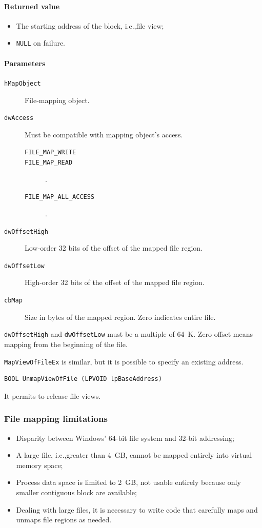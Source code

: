 \paragraph{Returned value}
\begin{itemize}
\item The starting address of the block, i.e.,\@ file view;
\item \texttt{NULL} on failure.
\end{itemize}

\paragraph{Parameters}
\begin{description}
\item [\texttt{hMapObject}] File-mapping object.
\item [\texttt{dwAccess}] Must be compatible with mapping object's access.
\begin{description}
\item [\texttt{FILE\_MAP\_WRITE}]
\item [\texttt{FILE\_MAP\_READ}].
\item [\texttt{FILE\_MAP\_ALL\_ACCESS}].
\end{description}
\item [\texttt{dwOffsetHigh}] Low-order 32 bits of the offset of the mapped file region.
\item [\texttt{dwOffsetLow}] High-order 32 bits of the offset of the mapped file region.
\item [\texttt{cbMap}] Size in bytes of the mapped region. Zero indicates entire file.
\end{description}
\texttt{dwOffsetHigh} and \texttt{dwOffsetLow} must be a multiple of 64~K. Zero offset means mapping from the beginning of the file.

\texttt{MapViewOfFileEx} is similar, but it is possible to specify an existing address.

\begin{verbatim}
BOOL UnmapViewOfFile (LPVOID lpBaseAddress)
\end{verbatim}
It permits to release file views.

\subsubsection{File mapping limitations}
\begin{itemize}
\item Disparity between Windows' 64-bit file system and 32-bit addressing;
\item A large file, i.e.,\@ greater than 4~GB, cannot be mapped entirely into virtual memory space;
\item Process data space is limited to 2~GB, not usable entirely because only smaller contiguous block are available;
\item Dealing with large files, it is necessary to write code that carefully maps and unmaps file regions as needed.
\end{itemize}

